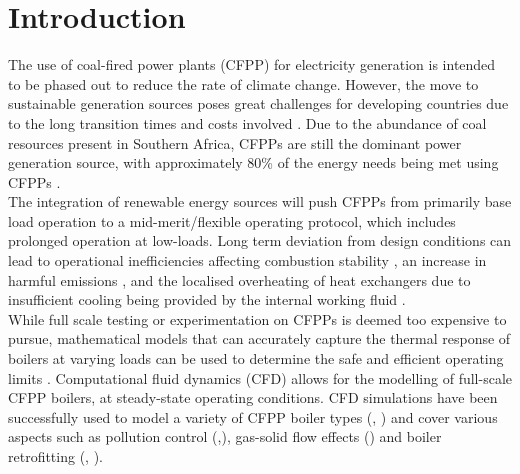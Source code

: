 \documentclass[twocolumn,10pt]{asme2ej}
\begin{document}
\begin{nomenclature}
\end{nomenclature}
\section{Introduction}
The use of coal-fired power plants (CFPP) for electricity generation is intended to be phased out to reduce the rate of climate change. However, the move to sustainable generation sources poses great challenges for developing countries due to the long transition times and costs involved \cite{ugum2019}. Due to the abundance of coal resources present in Southern Africa, CFPPs are still the dominant power generation source, with approximately 80\% of the energy needs being met using CFPPs \cite{eskom}.\\

The integration of renewable energy sources will push CFPPs from primarily base load operation to a mid-merit/flexible operating protocol, which includes prolonged operation at low-loads. Long term deviation from design conditions can lead to operational inefficiencies affecting combustion stability \cite{Hernik2020}, an increase in harmful emissions \cite{Chang2021}, and the localised overheating of heat exchangers due to insufficient cooling being provided by the internal working fluid \cite{Modlinski2019}.\\

While full scale testing or experimentation on CFPPs is deemed too expensive to pursue, mathematical models that can accurately capture the thermal response of boilers at varying loads can be used to determine the safe and efficient operating limits \cite{Laubscher2019b}. Computational fluid dynamics (CFD) allows for the modelling of full-scale CFPP boilers, at steady-state operating conditions. CFD simulations have been successfully used to model a variety of CFPP boiler types (\cite{Laubscher2019a}, \cite{Gu2020}) and cover various aspects such as pollution control (\cite{Du2017},\cite{Fan2001}), gas-solid flow effects (\cite{Chen2017}) and boiler retrofitting (\cite{Gu2020}, \cite{He2007}).\\
\end{document}

